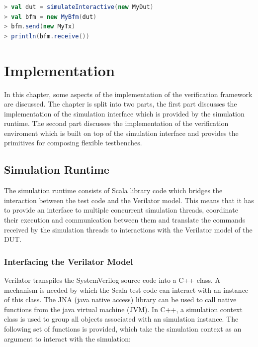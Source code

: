 \begin{listing}
\begin{lstlisting}[language=scala, captionpos=b, caption=Outline of an interactive debugging approach using the Scala REPL.,label=lst:debug_syntax]
> val dut = simulateInteractive(new MyDut)
> val bfm = new MyBfm(dut)
> bfm.send(new MyTx)
> println(bfm.receive())
\end{lstlisting}
\end{listing}

\chapter{Implementation} %

In this chapter, some aspects of the implementation of the verification framework are discussed. The chapter is split into two parts, the first part discusses the implementation of the simulation interface which is provided by the simulation runtime. The second part discusses the implementation of the verification enviroment which is built on top of the simulation interface and provides the primitives for composing flexible testbenches.



\section{Simulation Runtime} %

The simulation runtime consists of Scala library code which bridges the interaction between the test code and the Verilator model. This means that it has to provide an interface to multiple concurrent simulation threads, coordinate their execution and communication between them and translate the commands received by the simulation threads to interactions with the Verilator model of the DUT.

\subsection{Interfacing the Verilator Model} %

Verilator transpiles the SystemVerilog source code into a C++ class. A mechanism is needed by which the Scala test
code can interact with an instance of this class. The JNA (java native access) library can be used to call native
functions from the java virtual machine (JVM). In C++, a simulation context class is used to group all objects associated with an simulation instance. The following set of functions is provided, which take the simulation context as an argument to interact
with the simulation:

